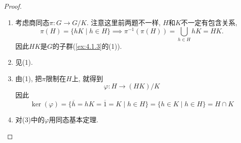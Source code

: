 \begin{proof}
    \begin{enumerate}[(1)]
        \item 考虑商同态$\pi:G \to G/K$. 注意这里前两题不一样, $H$和$K$不一定有包含关系, 
        \[
            \pi(H) = \{hK \mid h \in H\} \implies \pi^{-1}(\pi(H)) = \bigcup_{h \in H} hK = HK.
        \]
        因此$HK$是$G$的子群(\ref{ex:4.1.3}的(1)).
        \item 见(1).
        \item 由(1), 把$\pi$限制在$H$上, 就得到
        \[
            \varphi:H \to (HK)/K
        \]
        因此
        \[
            \ker(\varphi) = \{\overline{h} = hK = \overline{1} = K \mid h \in H\} = \{h \in K \mid h \in H\} = H \cap K
        \]
        \item 对(3)中的$\varphi$用同态基本定理.
    \end{enumerate}
\end{proof}